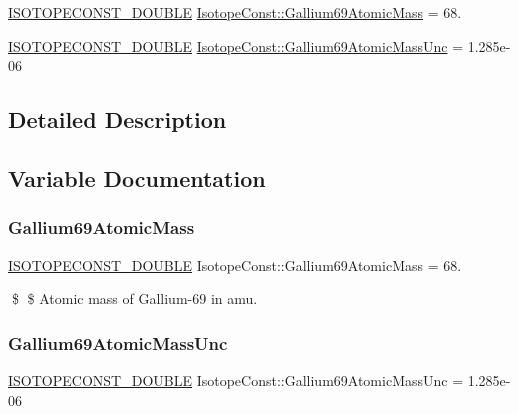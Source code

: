 \begin{DoxyCompactItemize}
\item 
\mbox{\hyperlink{group___isotope_const-_macros_ga8f45a7272ce02c0b4c65c44636ed719a}{I\+S\+O\+T\+O\+P\+E\+C\+O\+N\+S\+T\+\_\+\+D\+O\+U\+B\+LE}} \mbox{\hyperlink{group___isotope_const-_gallium-_ga69_gadedb4e50ade1c156d37c6223fe4f017a}{Isotope\+Const\+::\+Gallium69\+Atomic\+Mass}} = 68.
\item 
\mbox{\hyperlink{group___isotope_const-_macros_ga8f45a7272ce02c0b4c65c44636ed719a}{I\+S\+O\+T\+O\+P\+E\+C\+O\+N\+S\+T\+\_\+\+D\+O\+U\+B\+LE}} \mbox{\hyperlink{group___isotope_const-_gallium-_ga69_ga8615232027ce113d8ad1ec05b4df05f1}{Isotope\+Const\+::\+Gallium69\+Atomic\+Mass\+Unc}} = 1.\+285e-\/06
\end{DoxyCompactItemize}


\subsection{Detailed Description}


\subsection{Variable Documentation}
\mbox{\label{group___isotope_const-_gallium-_ga69_gadedb4e50ade1c156d37c6223fe4f017a}} 
\subsubsection{\texorpdfstring{Gallium69\+Atomic\+Mass}{Gallium69AtomicMass}}
{\footnotesize\ttfamily \mbox{\hyperlink{group___isotope_const-_macros_ga8f45a7272ce02c0b4c65c44636ed719a}{I\+S\+O\+T\+O\+P\+E\+C\+O\+N\+S\+T\+\_\+\+D\+O\+U\+B\+LE}} Isotope\+Const\+::\+Gallium69\+Atomic\+Mass = 68.}

\$ \$ Atomic mass of Gallium-\/69 in amu. \mbox{\label{group___isotope_const-_gallium-_ga69_ga8615232027ce113d8ad1ec05b4df05f1}} 
\subsubsection{\texorpdfstring{Gallium69\+Atomic\+Mass\+Unc}{Gallium69AtomicMassUnc}}
{\footnotesize\ttfamily \mbox{\hyperlink{group___isotope_const-_macros_ga8f45a7272ce02c0b4c65c44636ed719a}{I\+S\+O\+T\+O\+P\+E\+C\+O\+N\+S\+T\+\_\+\+D\+O\+U\+B\+LE}} Isotope\+Const\+::\+Gallium69\+Atomic\+Mass\+Unc = 1.\+285e-\/06}


